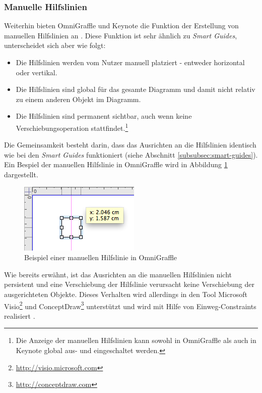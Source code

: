 \subsubsection{Manuelle Hilfslinien}

Weiterhin bieten OmniGraffle und Keynote die Funktion der Erstellung von manuellen Hilfslinien an \cite{08OmniGraffle, 11Keynote}. Diese Funktion ist sehr ähnlich zu \textit{Smart Guides}, unterscheidet sich aber wie folgt:

\begin{itemize}
    \item Die Hilfslinien werden vom Nutzer manuell platziert - entweder horizontal oder vertikal.
    \item Die Hilfslinien sind global für das gesamte Diagramm und damit nicht relativ zu einem anderen Objekt im Diagramm.
    \item Die Hilfslinien sind permanent sichtbar, auch wenn keine Verschiebungsoperation stattfindet.\footnote{Die Anzeige der manuellen Hilfslinien kann sowohl in OmniGraffle als auch in Keynote global aus- und eingeschaltet werden.}
\end{itemize}

Die Gemeinsamkeit besteht darin, dass das Ausrichten an die Hilfslinien identisch wie bei den \textit{Smart Guides} funktioniert (siehe Abschnitt \ref{subsubsec:smart-guides}). Ein Bespiel der manuellen Hilfslinie in OmniGraffle wird in Abbildung \ref{fig:omnigraffle-manual-guides} dargestellt.

\begin{figure}[hbt]
    \centering
    \includegraphics{resources/omnigraffle-manual-guides.png}
    \caption{Beispiel einer manuellen Hilfslinie in OmniGraffle}
    \label{fig:omnigraffle-manual-guides}
\end{figure}

Wie bereits erwähnt, ist das Ausrichten an die manuellen Hilfslinien nicht persistent und eine Verschiebung der Hilfslinie verursacht keine Verschiebung der ausgerichteten Objekte. Dieses Verhalten wird allerdings in den Tool Microsoft Visio\footnote{\url{http://visio.microsoft.com}} und ConceptDraw\footnote{\url{http://conceptdraw.com}} unterstützt und wird mit Hilfe von Einweg-Constraints realisiert \cite[S.20]{Maier12A-Pattern-based}.

